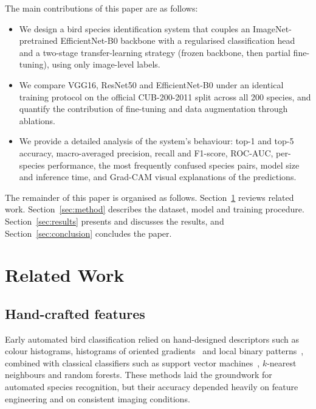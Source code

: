 \documentclass[conference]{IEEEtran}
\begin{document}
The main contributions of this paper are as follows:
\begin{itemize}
\item We design a bird species identification system that couples an
ImageNet-pretrained EfficientNet-B0 backbone with a regularised classification
head and a two-stage transfer-learning strategy (frozen backbone, then partial
fine-tuning), using only image-level labels.
\item We compare VGG16, ResNet50 and EfficientNet-B0 under an identical training
protocol on the official CUB-200-2011 split across all 200 species, and quantify
the contribution of fine-tuning and data augmentation through ablations.
\item We provide a detailed analysis of the system's behaviour: top-1 and top-5
accuracy, macro-averaged precision, recall and F1-score, ROC-AUC, per-species
performance, the most frequently confused species pairs, model size and
inference time, and Grad-CAM visual explanations of the predictions.
\end{itemize}

The remainder of this paper is organised as follows. Section~\ref{sec:related}
reviews related work. Section~\ref{sec:method} describes the dataset, model and
training procedure. Section~\ref{sec:results} presents and discusses the
results, and Section~\ref{sec:conclusion} concludes the paper.

\section{Related Work}\label{sec:related}
\subsection{Hand-crafted features}
Early automated bird classification relied on hand-designed descriptors such as
colour histograms, histograms of oriented gradients~\cite{dalal2005} and local
binary patterns~\cite{ojala2002}, combined with classical classifiers such as
support vector machines~\cite{cortes1995}, $k$-nearest neighbours and random
forests. These methods laid the groundwork for automated species recognition,
but their accuracy depended heavily on feature engineering and on consistent
imaging conditions.
\end{document}
